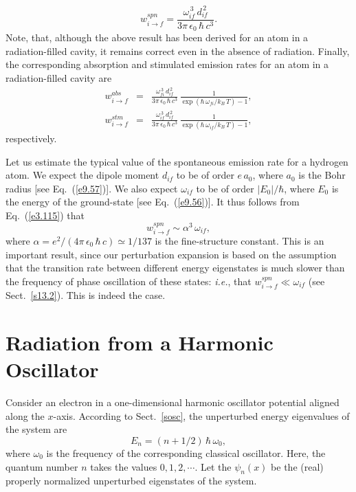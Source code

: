 \begin{equation}\label{e3.115}
w_{i\rightarrow f}^{spn} = \frac{\omega_{if}^{\,3}\,d_{if}^{\,2}}{3\pi\,\epsilon_0\,\hbar\,c^3}.
\end{equation}
Note,  that, although the above result has been derived for
an atom in a radiation-filled cavity, it remains correct even in the absence
of radiation.
Finally, the corresponding absorption and stimulated emission rates 
for an atom in a radiation-filled  cavity are
\begin{eqnarray}
w_{i\rightarrow f}^{abs} &=& \frac{\omega_{fi}^{\,3}\,d_{if}^{\,2}}{3\pi\,\epsilon_0\,\hbar\,c^3}\,\frac{1}
{\exp(\hbar\,\omega_{fi}/k_B\,T)-1},\\[0.5ex]
w_{i\rightarrow f}^{stm} &=& \frac{\omega_{if}^{\,3}\,d_{if}^{\,2}}{3\pi\,\epsilon_0\,\hbar\,c^3}\,\frac{1}
{\exp(\hbar\,\omega_{if}/k_B\,T)-1},
\end{eqnarray}
respectively.

Let us estimate the typical value of the spontaneous emission rate for a
hydrogen atom. We expect the dipole moment $d_{if}$ to be
of order $e\,a_0$, where $a_0$ is the Bohr radius [see Eq.~(\ref{e9.57})].
We also expect $\omega_{if}$ to be of order $|E_0|/\hbar$, where $E_0$
is the energy of the ground-state [see Eq.~(\ref{e9.56})]. It thus
follows from Eq.~(\ref{e3.115}) that
\begin{equation}
w_{i\rightarrow f}^{spn} \sim \alpha^3\,\omega_{if},
\end{equation}
where $\alpha = e^2/(4\pi\,\epsilon_0\,\hbar\,c)\simeq 1/137$ is
the fine-structure constant. This is an important result, since our perturbation
expansion is based on the assumption that the transition rate between different energy
eigenstates is much slower than the frequency of phase oscillation of these states: {\em
i.e.}, that $w_{i\rightarrow f}^{spn} \ll \omega_{if}$ (see Sect.~\ref{s13.2}). This is indeed the
case.

\section{Radiation from a Harmonic Oscillator}
Consider an electron in a one-dimensional harmonic oscillator
potential aligned along the $x$-axis. According to Sect.~\ref{sosc}, the
unperturbed energy eigenvalues of the system are
\begin{equation}
E_n = (n+1/2)\,\hbar\,\omega_0,
\end{equation}
where $\omega_0$ is the frequency of the corresponding classical
oscillator. Here, the quantum number $n$ takes the values $0,1,2,\cdots$. 
Let the $\psi_n(x)$ be the  (real) properly normalized unperturbed eigenstates of the system.

